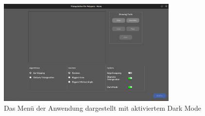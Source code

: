 \begin{figure}[h]
    \centering
    \includegraphics[width=0.8\textwidth]{bilder/darkmode.png}
    \caption[Menü im Dark Mode]{Das Menü der Anwendung dargestellt mit aktiviertem Dark Mode}
    
\end{figure}

